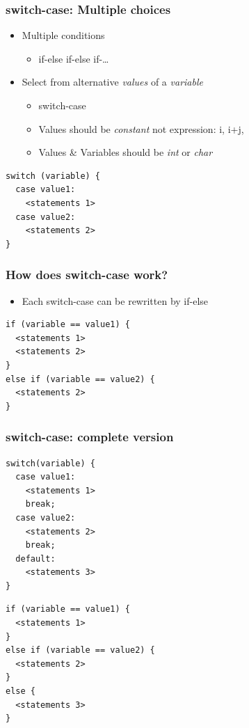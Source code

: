 \documentclass{../c-lecture}
\begin{document}
\begin{frame}[fragile]
  \frametitle{switch-case: Multiple choices}
  \begin{itemize}
    \item Multiple conditions
    \begin{itemize}
      \item if-else if-else if-\ldots
    \end{itemize}
    \item
      Select from alternative \textit{\color{Orange} values} of a
      \textit{\color{LimeGreen} variable}

    \begin{itemize}
      \item switch-case
      \item
        Values should be \textit{\color{Orange} constant} not expression:
        i, i+j,

      \item
        Values \& Variables should be \textit{\color{Orange} int} or
        \textit{\color{Orange} char}

    \end{itemize}
  \end{itemize}
  \begin{verbatim}
switch (variable) {
  case value1:
    <statements 1>
  case value2:
    <statements 2>
}
  \end{verbatim}
\end{frame}

\begin{frame}[fragile]
  \frametitle{How does switch-case work?}
  \begin{itemize}
    \item Each switch-case can be rewritten by if-else
  \end{itemize}
  \begin{verbatim}
if (variable == value1) {
  <statements 1>
  <statements 2>
}
else if (variable == value2) {
  <statements 2>
}
  \end{verbatim}
\end{frame}

\begin{frame}[fragile]
  \frametitle{switch-case: complete version}
  \scriptsize
  \begin{verbatim}
switch(variable) {
  case value1:
    <statements 1>
    break;
  case value2:
    <statements 2>
    break;
  default:
    <statements 3>
}
  \end{verbatim}
  \scriptsize
  \begin{verbatim}
if (variable == value1) {
  <statements 1>
}
else if (variable == value2) {
  <statements 2>
}
else {
  <statements 3>
}
  \end{verbatim}
\end{frame}
\end{document}
